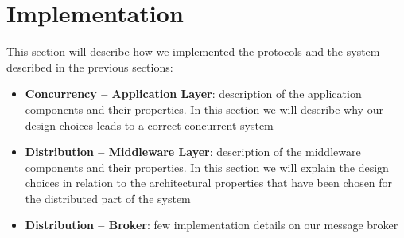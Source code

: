 \section{Implementation}\label{}

This section will describe how we implemented the protocols and the system
described in the previous sections:

\begin{itemize}
\item \textbf{Concurrency -- Application Layer}:
  description of the application components and their properties. In this
  section we will describe why our design choices leads to a correct concurrent
  system
\item \textbf{Distribution -- Middleware Layer}:
  description of the middleware components and their properties. In this
  section we will explain the design choices in relation to the architectural
  properties that have been chosen for the distributed part of the system
\item \textbf{Distribution -- Broker}:
  few implementation details on our message broker
\end{itemize}








